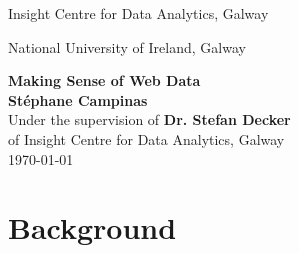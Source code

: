 \documentclass[12pt,chapterprefix=true]{scrbook}
\begin{document}
\begin{titlepage}
	\begin{center}
		\null
		\vspace{2cm}
		{\Large
		Insight Centre for Data Analytics, Galway\\
		\begin{figure}[h]
			\centering
		\end{figure}
		National University of Ireland, Galway\\
		\begin{figure}[h]
			\centering
		\end{figure}
		}
		\vspace{2cm}
		{\Huge \textbf{Making Sense of Web Data}}\\
		\vspace{1cm}
		{\Large \textbf{St\'ephane Campinas}}\\
		\vspace{1cm}
		Under the supervision of \textbf{Dr. Stefan Decker}\\
		of Insight Centre for Data Analytics, Galway\\
		\vspace{2cm}
		\today
	\end{center}
\end{titlepage}


%

\cleardoubleoddpage
\setcounter{tocdepth}{1}
\tableofcontents
\cleardoubleoddpage
\listoffigures
\listoftables
\listoftheorems[ignoreall,show={definition},numwidth=3.5em]
\cleardoubleoddpage
{}

\part{Background}






%
\end{document}
